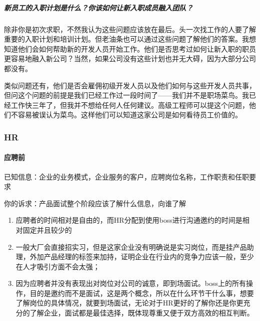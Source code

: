 \documentclass[letterpaper,11pt,english]{sphinxmanual}
\begin{document}
\subparagraph{新员工的入职计划是什么？你该如何让新入职成员融入团队？}
\label{\detokenize{chapter_interview/interviewer:id12}}
除非你是初次求职，不然我认为这些问题应该放在最后。头一次找工作的人要了解重要的入职计划和培训计划。但老油条也可以通过这些问题了解他们的答案。我想知道他们会如何帮助新的开发人员开始工作。他们是否思考过如何让新入职的职员更容易地融入新公司？当然，如果公司没有这些计划也并无大碍，因为大部分公司都没有。

类似问题还有，他们是否会雇佣初级开发人员以及他们如何与这些开发人员共事，但问这个问题的前提是我们已经工作过一段时间了——我们并不是职场菜鸟。我已经工作快三年了，但我并不想给任何人任何建议。高级工程师可以提这个问题，他们不容易被误认为菜鸟。这样他们可以知道这家公司是如何看待员工价值的。


\subsubsection{HR}
\label{\detokenize{chapter_interview/HR:hr}}\label{\detokenize{chapter_interview/HR::doc}}

\paragraph{应聘前}
\label{\detokenize{chapter_interview/HR:id1}}
已知信息：企业的业务模式，企业服务的客户，应聘岗位名称，工作职责和任职要求

你的诉求：产品面试整个阶段应该了解什么信息，向谁了解
\begin{enumerate}
%
\item {} 
应聘者的时间相对是自由的，而HR分配到使用boss进行沟通邀约的时间是相对固定并且较少的
%
\begin{footnote}[288]\sphinxAtStartFootnote
{}
%
\end{footnote}

\item {} 
一般大厂会直接招实习，但是这家企业没有明确说是实习岗位，而是挂产品助理，外加产品经理的标签来加持，证明企业在行业内的竞争力应该一般，至少在人才吸引方面不会太强；

\item {} 
因为应聘者并没有表现出对岗位对公司的诚意，即到场面试。boss上的所有操作，目的是邀约而不是面试，这是两个概念，所以在什么环节干什么事，想要了解岗位的具体情况，就要到场面试，无论对于HR更好的了解你还是你更充分的了解企业，面试都是最佳选择，既体现尊重又便于双方高效的相互判断。

\end{enumerate}
\end{document}
